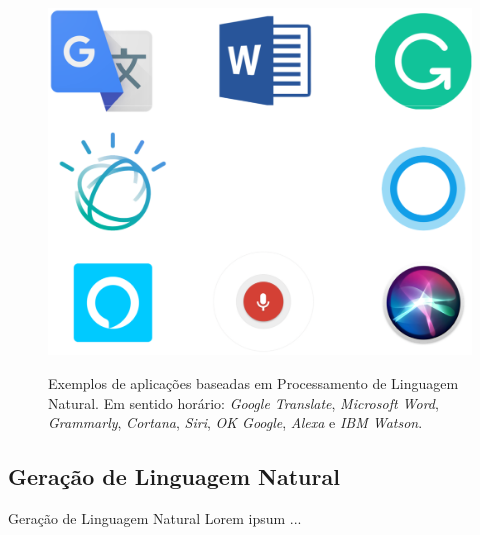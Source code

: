 \begin{frame}
	\begin{figure}[!ht]
		\centering
		\includegraphics[scale=0.4]{figs/nlp_applications.eps}	
		\label{f.nlp_applications}
		\caption{Exemplos de aplicações baseadas em Processamento de Linguagem Natural. Em sentido horário: \emph{Google Translate}, \emph{Microsoft Word}, \emph{Grammarly}, \emph{Cortana}, \emph{Siri}, \emph{OK Google}, \emph{Alexa} e \emph{IBM Watson}.}
	\end{figure}
\end{frame}

\subsection{Geração de Linguagem Natural}
\label{ss.gln}

\begin{frame}{Geração de Linguagem Natural}
	Lorem ipsum ...
\end{frame}